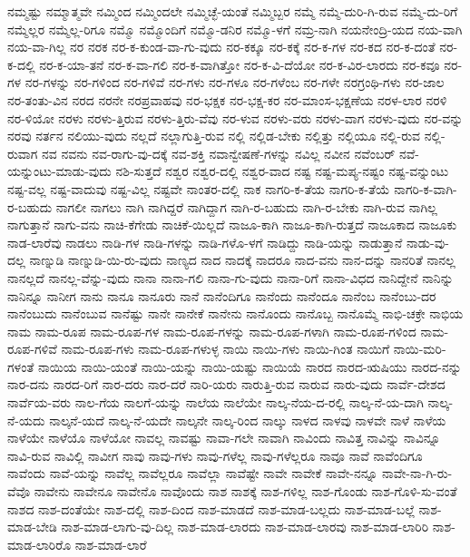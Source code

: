 {ನಮ್ಮಷ್ಟು
ನಮ್ಮಾತ್ಮವೇ
ನಮ್ಮಿಂದ
ನಮ್ಮಿಂದಲೇ
ನಮ್ಮಿಚ್ಛೆ-ಯಂತೆ
ನಮ್ಮಿಬ್ಬರ
ನಮ್ಮೆ
ನಮ್ಮೆ-ದುರಿ-ಗಿ-ರುವ
ನಮ್ಮೆ-ದು-ರಿಗೆ
ನಮ್ಮೆಲ್ಲರ
ನಮ್ಮೆಲ್ಲ-ರಿಗೂ
ನಮ್ಮೊ
ನಮ್ಮೊಂದಿಗೆ
ನಮ್ಮೊ-ಡನಿರ
ನಮ್ಮೊ-ಳಗೆ
ನಮ್ರ-ನಾಗಿ
ನಯನೇಂದ್ರಿ-ಯದ
ನಯ-ವಾಗಿ
ನಯ-ವಾ-ಗಿಲ್ಲ
ನರ
ನರಕ
ನರ-ಕ-ಕುಂಡ-ವಾ-ಗು-ವುದು
ನರ-ಕಕ್ಕೂ
ನರ-ಕಕ್ಕೆ
ನರ-ಕ-ಗಳ
ನರ-ಕದ
ನರ-ಕ-ದಂತೆ
ನರ-ಕ-ದಲ್ಲಿ
ನರ-ಕ-ಯಾ-ತನೆ
ನರ-ಕ-ವಾ-ಗಲಿ
ನರ-ಕ-ವಾಗಿತ್ತೋ
ನರ-ಕ-ವಿ-ದೆಯೋ
ನರ-ಕ-ವಿರ-ಲಾರದು
ನರ-ಕವೂ
ನರ-ಗಳ
ನರ-ಗಳನ್ನು
ನರ-ಗಳಿಂದ
ನರ-ಗಳಿವೆ
ನರ-ಗಳು
ನರ-ಗಳೂ
ನರ-ಗಳೆಂಬ
ನರ-ಗಳೇ
ನರಗ್ರಂಥಿ-ಗಳು
ನರ-ಜಾಲ
ನರ-ತಂತು-ವಿನ
ನರದ
ನರನೇ
ನರಪ್ರವಾಹವು
ನರ-ಭಕ್ಷಕ
ನರ-ಭಕ್ಷ-ಕರ
ನರ-ಮಾಂಸ-ಭಕ್ಷಣೆಯ
ನರಳ-ಲಾರ
ನರಳಿ
ನರ-ಳಿಯೋ
ನರಳು
ನರಳು-ತ್ತಿರುವ
ನರಳು-ತ್ತಿರು-ವೆವು
ನರ-ಳುವ
ನರಳು-ವರು
ನರಳು-ವಾಗ
ನರಳು-ವುದು
ನರ-ವನ್ನು
ನರವು
ನರ್ತನ
ನಲಿಯು-ವುದು
ನಲ್ಲದೆ
ನಲ್ಲಾಗುತ್ತಿ-ರುವ
ನಲ್ಲಿ
ನಲ್ಲಿಡ-ಬೇಕು
ನಲ್ಲಿತ್ತು
ನಲ್ಲಿಯೂ
ನಲ್ಲಿ-ರುವ
ನಲ್ಲಿ-ರುವಾಗ
ನವ
ನವನು
ನವ-ರಾಗು-ವು-ದಕ್ಕೆ
ನವ-ಶಕ್ತಿ
ನವಾನ್ವೇಷಣೆ-ಗಳನ್ನು
ನವಿಲ್ಲ
ನವೀನ
ನವೆಂಬರ್
ನವೆ-ಯನ್ನುಂಟು-ಮಾಡು-ವುದು
ನಶಿ-ಸುತ್ತದೆ
ನಶ್ವರ
ನಶ್ವರ-ದಲ್ಲಿ
ನಶ್ವರ-ವಾದ
ನಷ್ಟ
ನಷ್ಟ-ಮಪ್ಯ-ನಷ್ಟಂ
ನಷ್ಟ-ವನ್ನುಂಟು
ನಷ್ಟ-ವಲ್ಲ
ನಷ್ಟ-ವಾದುವು
ನಷ್ಟ-ವಿಲ್ಲ
ನಷ್ಟವೇ
ನಾಂತರ-ದಲ್ಲಿ
ನಾಕ
ನಾಗರಿ-ಕ-ತೆಯ
ನಾಗರಿ-ಕ-ತೆಯೆ
ನಾಗರಿ-ಕ-ವಾಗಿ-ರ-ಬಹುದು
ನಾಗಲೀ
ನಾಗಲು
ನಾಗಿ
ನಾಗಿದ್ದರೆ
ನಾಗಿದ್ದಾಗ
ನಾಗಿ-ರ-ಬಹುದು
ನಾಗಿ-ರ-ಬೇಕು
ನಾಗಿ-ರುವ
ನಾಗಿಲ್ಲ
ನಾಗುತ್ತಾನೆ
ನಾಗು-ವನು
ನಾಚಿ-ಕೆಗೇಡು
ನಾಚಿಕೆ-ಯಿಲ್ಲದೆ
ನಾಜೂ-ಕಾಗಿ
ನಾಜೂ-ಕಾಗಿ-ರುತ್ತದೆ
ನಾಜೂಕಾದ
ನಾಜೂಕು
ನಾಡ-ಲಾರೆವು
ನಾಡಲು
ನಾಡಿ-ಗಳ
ನಾಡಿ-ಗಳನ್ನು
ನಾಡಿ-ಗಳೊ-ಳಗೆ
ನಾಡಿದ್ದು
ನಾಡಿ-ಯನ್ನು
ನಾಡುತ್ತಾನೆ
ನಾಡು-ವು-ದಲ್ಲ
ನಾಣ್ನುಡಿ
ನಾಣ್ನುಡಿ-ಯಿ-ರು-ವುದು
ನಾಣ್ಯದ
ನಾದ
ನಾದಕ್ಕೆ
ನಾದರೂ
ನಾದ-ವನು
ನಾನ-ದನ್ನು
ನಾನರಿತೆ
ನಾನಲ್ಲ
ನಾನಲ್ಲದೆ
ನಾನಲ್ಲ-ವೆನ್ನು-ವುದು
ನಾನಾ
ನಾನಾ-ಗಲಿ
ನಾನಾ-ಗು-ವುದು
ನಾನಾ-ರಿಗೆ
ನಾನಾ-ವಿಧದ
ನಾನಿದ್ದೇನೆ
ನಾನಿನ್ನು
ನಾನಿನ್ನೂ
ನಾನೀಗ
ನಾನು
ನಾನೂ
ನಾನೂರು
ನಾನೆ
ನಾನೆಂದಿಗೂ
ನಾನೆಂದು
ನಾನೆಂದೂ
ನಾನೆಂಬ
ನಾನೆಂಬು-ದರ
ನಾನೆಂಬುದು
ನಾನೆಂಬುವ
ನಾನೆಷ್ಟು
ನಾನೇ
ನಾನೇಕೆ
ನಾನೇನು
ನಾನೊಂದು
ನಾನೊಬ್ಬ
ನಾನೊಮ್ಮೆ
ನಾಭಿ-ಚಕ್ರೇ
ನಾಭಿಯ
ನಾಮ
ನಾಮ-ರೂಪ
ನಾಮ-ರೂಪ-ಗಳ
ನಾಮ-ರೂಪ-ಗಳನ್ನು
ನಾಮ-ರೂಪ-ಗಳಾಗಿ
ನಾಮ-ರೂಪ-ಗಳಿಂದ
ನಾಮ-ರೂಪ-ಗಳಿವೆ
ನಾಮ-ರೂಪ-ಗಳು
ನಾಮ-ರೂಪ-ಗಳುಳ್ಳ
ನಾಯಿ
ನಾಯಿ-ಗಳು
ನಾಯಿ-ಗಿಂತ
ನಾಯಿಗೆ
ನಾಯಿ-ಮರಿ-ಗಳಂತೆ
ನಾಯಿಯ
ನಾಯಿ-ಯಂತೆ
ನಾಯಿ-ಯನ್ನು
ನಾಯಿ-ಯಷ್ಟು
ನಾಯಿಯೆ
ನಾರದ
ನಾರದ-ಋಷಿಯು
ನಾರದ-ನನ್ನು
ನಾರ-ದನು
ನಾರದ-ರಿಗೆ
ನಾರ-ದರು
ನಾರ-ದರೆ
ನಾರಿ-ಯರು
ನಾರುತ್ತಿ-ರುವ
ನಾರುವ
ನಾರು-ವುದು
ನಾರ್ವೆ-ದೇಶದ
ನಾರ್ವೆಯ-ವರು
ನಾಲ-ಗೆಯ
ನಾಲಗೆ-ಯನ್ನು
ನಾಲೆಯ
ನಾಲೆಯೇ
ನಾಲ್ಕ-ನೆಯ-ದ-ರಲ್ಲಿ
ನಾಲ್ಕ-ನೆ-ಯ-ದಾಗಿ
ನಾಲ್ಕ-ನೆ-ಯದು
ನಾಲ್ಕನೆ-ಯದೆ
ನಾಲ್ಕ-ನೆ-ಯದೇ
ನಾಲ್ಕನೇ
ನಾಲ್ಕ-ರಿಂದ
ನಾಲ್ಕು
ನಾಳದ
ನಾಳವು
ನಾಳವೇ
ನಾಳೆ
ನಾಳೆಯ
ನಾಳೆಯೇ
ನಾಳೆಯೊ
ನಾಳೆಯೋ
ನಾವಲ್ಲ
ನಾವಷ್ಟು
ನಾವಾ-ಗಲೇ
ನಾವಾಗಿ
ನಾವಿಂದು
ನಾವಿತ್ತ
ನಾವಿನ್ನು
ನಾವಿನ್ನೂ
ನಾವಿ-ರುವ
ನಾವಿಲ್ಲಿ
ನಾವೀಗ
ನಾವು
ನಾವು-ಗಳು
ನಾವು-ಗಳೆಲ್ಲ
ನಾವು-ಗಳೆಲ್ಲರೂ
ನಾವೂ
ನಾವೆ
ನಾವೆಂದಿಗೂ
ನಾವೆಂದು
ನಾವೆ-ಯನ್ನು
ನಾವೆಲ್ಲ
ನಾವೆಲ್ಲರೂ
ನಾವೆಲ್ಲಾ
ನಾವೆಷ್ಟೇ
ನಾವೇ
ನಾವೇಕೆ
ನಾವೇ-ನನ್ನೂ
ನಾವೇ-ನಾ-ಗಿ-ರು-ವೆವೊ
ನಾವೇನು
ನಾವೇನೂ
ನಾವೇನೊ
ನಾವೊಂದು
ನಾಶ
ನಾಶಕ್ಕೆ
ನಾಶ-ಗಳಿಲ್ಲ
ನಾಶ-ಗೊಂಡು
ನಾಶ-ಗೊಳಿ-ಸು-ವಂತೆ
ನಾಶದ
ನಾಶ-ದಂತೆಯೇ
ನಾಶ-ದಲ್ಲಿ
ನಾಶ-ದಿಂದ
ನಾಶ-ಮಾಡದೆ
ನಾಶ-ಮಾಡ-ಬಲ್ಲದು
ನಾಶ-ಮಾಡ-ಬಲ್ಲೆ
ನಾಶ-ಮಾಡ-ಬೇಡಿ
ನಾಶ-ಮಾಡ-ಲಾಗು-ವು-ದಿಲ್ಲ
ನಾಶ-ಮಾಡ-ಲಾರದು
ನಾಶ-ಮಾಡ-ಲಾರವು
ನಾಶ-ಮಾಡ-ಲಾರಿರಿ
ನಾಶ-ಮಾಡ-ಲಾರಿರೊ
ನಾಶ-ಮಾಡ-ಲಾರೆ
}
